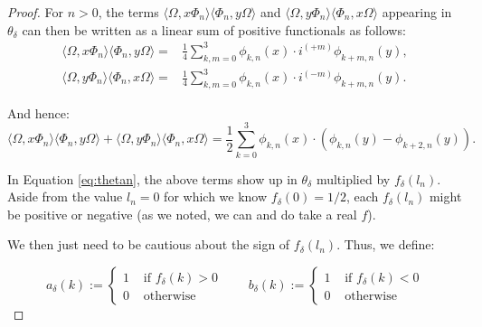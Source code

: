 \documentclass[a4paper,12pt]{article}
\theoremstyle{plain}
\theoremstyle{definition}
\theoremstyle{remark}
\newcommand{\inner}  [2]{\langle #1 , #2 \rangle}
\begin{document}
\begin{proof}
  For $n>0$, the terms $\inner{\Omega}{x\Phi_n}\inner{\Phi_n}{y\Omega}$ and
  $\inner{\Omega}{y\Phi_n}\inner{\Phi_n}{x\Omega}$
  appearing in $\theta_\delta$ can then be written as a linear sum of positive functionals as follows:
\begin{align*}
  \inner{\Omega}{x\Phi_n}\inner{\Phi_n}{y\Omega} =
  & \frac{1}{4}\sum_{k,m=0}^3 \phi_{k,n}(x) \cdot i^{(+m)} \phi_{k+m,n}(y),\\
  \inner{\Omega}{y\Phi_n}\inner{\Phi_n}{x\Omega} =
  & \frac{1}{4}\sum_{k,m=0}^3 \phi_{k,n}(x) \cdot i^{(-m)} \phi_{k+m,n}(y).
\end{align*}


And hence:
 \[
  \inner{\Omega}{x\Phi_n}\inner{\Phi_n}{y\Omega} + \inner{\Omega}{y\Phi_n}\inner{\Phi_n}{x\Omega} =
  \frac{1}{2}\sum_{k=0}^3 \phi_{k,n}(x) \cdot \left(\phi_{k,n}(y) - \phi_{k+2,n}(y)\right).
 \]

In Equation \eqref{eq:thetan}, the above terms show up in $\theta_\delta$ multiplied by $f_\delta(l_n)$.
Aside from the value $l_n=0$ for which we know $f_\delta(0) = 1/2$,
each $f_\delta(l_n)$ might be positive or negative (as we noted, we can and do take a real $f$).

We then just need to be cautious about the sign of $f_\delta(l_n)$. Thus, we define:

\begin{equation*}%
  a_\delta(k) := \left\{ \begin{array}{cl}
  1 & \textrm{ if } f_\delta(k) > 0 \\
  0 & \textrm{ otherwise}
\end{array}\right. \qquad
b_\delta(k) := \left\{ \begin{array}{cl}
  1 & \textrm{ if } f_\delta(k) < 0 \\
  0 & \textrm{ otherwise}
\end{array}\right. \end{equation*}


\end{proof}
\end{document}
